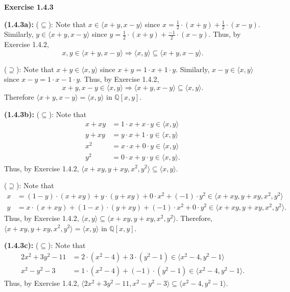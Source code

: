 \documentclass[12pt,oneside]{article}
\newenvironment{exercise}[1]{\vspace{.1in}\noindent\textbf{Exercise #1 \hspace{.05em}}}{}
\newcommand{\Q}{\mathbb{Q}}
\begin{document}
\begin{exercise}{1.4.3}

    \bigskip
    \textbf{(1.4.3a):} ($\subseteq$): Note that $x \in \langle x+y, x-y \rangle$ since
    $x = \frac{1}{2} \cdot (x + y) + \frac{1}{2} \cdot (x-y)$. Similarly, 
    $y \in \langle x+y, x-y \rangle$ since 
    $y = \frac{1}{2} \cdot (x + y) + \frac{-1}{2} \cdot (x-y)$. Thus, by 
    Exercise 1.4.2, 
    \[
        x,y \in \langle x+y, x-y \rangle \Rightarrow \langle x,y \rangle \subseteq \langle x+y, x-y \rangle.
    \] 

    \bigskip
    ($\supseteq$): Note that $x+y \in \langle x,y \rangle$ since 
    $x+y = 1 \cdot x+1 \cdot y$. Similarly, $x-y \in \langle x,y \rangle$ since 
    $x-y = 1 \cdot x-1 \cdot y$. Thus, by Exercise 1.4.2,
    \[
        x+y,x-y \in \langle x,y \rangle \Rightarrow \langle x+y,x-y \rangle \subseteq \langle x,y \rangle.
    \]
    Therefore $\langle x+y,x-y \rangle = \langle x,y \rangle$ in $\Q[x,y]$.

    \bigskip
    \textbf{(1.4.3b):} ($\subseteq$): Note that 
    \begin{align*}
        x+xy &= 1 \cdot x + x \cdot y \in \langle x,y \rangle \\
        y+xy &= y \cdot x + 1 \cdot y \in \langle x,y \rangle \\
        x^2 &= x \cdot x + 0 \cdot y \in \langle x,y \rangle \\
        y^2 &= 0 \cdot x + y \cdot y \in \langle x,y \rangle.
    \end{align*}
    Thus, by Exercise 1.4.2, $\langle x+xy, y+xy,x^2,y^2 \rangle \subseteq \langle x,y \rangle$.

    \bigskip
    ($\supseteq$): Note that
    \begin{align*}
        x &= (1-y) \cdot (x+xy) + y \cdot (y+xy) + 0 \cdot x^2 + (-1) \cdot y^2 \in \langle x+xy,y+xy,x^2,y^2 \rangle \\
        y &= x \cdot (x+xy) + (1-x) \cdot (y+xy) + (-1) \cdot x^2 + 0 \cdot y^2 \in \langle x+xy,y+xy,x^2,y^2 \rangle.
    \end{align*}
    Thus, by Exercise 1.4.2, $\langle x,y \rangle \subseteq \langle x+xy, y+xy,x^2,y^2 \rangle$.
    Therefore, $\langle x+xy, y+xy,x^2,y^2 \rangle = \langle x,y \rangle$ in $\Q[x,y]$.

    \bigskip
    \textbf{(1.4.3c):} ($\subseteq$): Note that 
    \begin{align*}
        2x^2+3y^2-11 &= 2 \cdot (x^2-4) + 3 \cdot (y^2-1) \in \langle x^2-4,y^2-1 \rangle \\
        x^2-y^2-3    &= 1 \cdot (x^2-4) + (-1) \cdot (y^2-1) \in \langle x^2-4,y^2-1 \rangle.
    \end{align*}
    Thus, by Exercise 1.4.2, $\langle 2x^2+3y^2-11, x^2-y^2-3 \rangle \subseteq \langle x^2-4,y^2-1 \rangle$.


\end{exercise}
\end{document}
